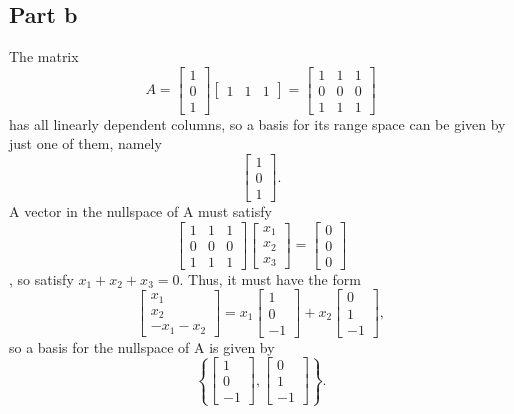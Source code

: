 \documentclass{article}
\begin{document}
\subsection{Part b}
The matrix 
\[
A = \begin{bmatrix}
1 \\ 0 \\ 1
\end{bmatrix} 
\begin{bmatrix}
1 & 1 & 1
\end{bmatrix} =
\begin{bmatrix}
1&1&1\\
0&0&0\\
1&1&1
\end{bmatrix}
\]
has all linearly dependent columns, so a basis for its range space can be given by just one of them, namely 
\[\begin{bmatrix}
1 \\0\\1
\end{bmatrix}.\]
A vector in the nullspace of A must satisfy 
\[
\begin{bmatrix}
1&1&1\\
0&0&0\\
1&1&1
\end{bmatrix}
\begin{bmatrix}
x_1\\x_2\\x_3
\end{bmatrix}
=\begin{bmatrix}
0\\0\\0
\end{bmatrix}
\],
so satisfy $x_1+x_2+x_3=0$. Thus, it must have the form
\[
\begin{bmatrix}
x_1\\x_2\\-x_1-x_2
\end{bmatrix}
=x_1\begin{bmatrix}
1\\0\\-1
\end{bmatrix}+x_2\begin{bmatrix}
0\\1\\-1
\end{bmatrix},
\]
so a basis for the nullspace of A is given by
\[
\left\{\begin{bmatrix}
1\\0\\-1
\end{bmatrix},\begin{bmatrix}
0\\1\\-1
\end{bmatrix}\right\}.
\]
\end{document}
